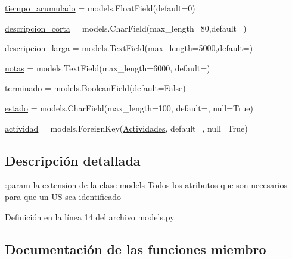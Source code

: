 \begin{DoxyCompactItemize}
\item 
\hyperlink{classuser_story_1_1models_1_1_user_stories_a2548818f576e0fd6fd91b3750d1fe1f4}{tiempo\+\_\+acumulado} = models.\+Float\+Field(default=0)
\item 
\hyperlink{classuser_story_1_1models_1_1_user_stories_a48ef4cf166f2feccd1728a8b68d89b7e}{descripcion\+\_\+corta} = models.\+Char\+Field(max\+\_\+length=80,default=\textquotesingle{}\textquotesingle{})
\item 
\hyperlink{classuser_story_1_1models_1_1_user_stories_a05d086050cb66bb31d2406622f964704}{descripcion\+\_\+larga} = models.\+Text\+Field(max\+\_\+length=5000,default=\textquotesingle{}\textquotesingle{})
\item 
\hyperlink{classuser_story_1_1models_1_1_user_stories_ae88fff4e2e6fe453a5f13412bdf1a985}{notas} = models.\+Text\+Field(max\+\_\+length=6000, default=\textquotesingle{}\textquotesingle{})
\item 
\hyperlink{classuser_story_1_1models_1_1_user_stories_a89ef1d61ea0200dbdf1838bd2d10cc29}{terminado} = models.\+Boolean\+Field(default=False)
\item 
\hyperlink{classuser_story_1_1models_1_1_user_stories_acdeffb640834747b701ee1b1562ea47d}{estado} = models.\+Char\+Field(max\+\_\+length=100, default=\textquotesingle{}\textquotesingle{}, null=True)
\item 
\hyperlink{classuser_story_1_1models_1_1_user_stories_a589704713cc509199343a09d27f210e9}{actividad} = models.\+Foreign\+Key(\hyperlink{classflujos_1_1models_1_1_actividades}{Actividades}, default=\textquotesingle{}\textquotesingle{}, null=True)
\end{DoxyCompactItemize}


\subsection{Descripción detallada}
\begin{DoxyVerb}:param la extension de la clase models
Todos los atributos que son necesarios para que un US sea identificado\end{DoxyVerb}
 

Definición en la línea 14 del archivo models.\+py.



\subsection{Documentación de las funciones miembro}
